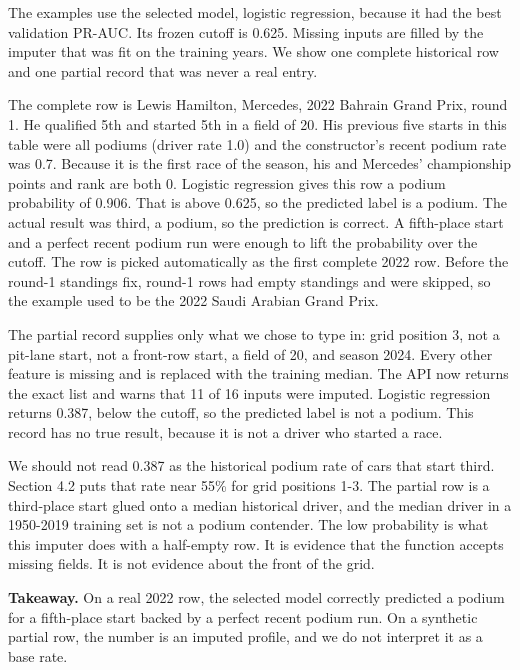 \documentclass[10pt,a4paper]{article}
\begin{document}
The examples use the selected model, logistic regression, because it had the best validation PR-AUC. Its frozen cutoff is 0.625. Missing inputs are filled by the imputer that was fit on the training years. We show one complete historical row and one partial record that was never a real entry.


The complete row is Lewis Hamilton, Mercedes, 2022 Bahrain Grand Prix, round 1. He qualified 5th and started 5th in a field of 20. His previous five starts in this table were all podiums (driver rate 1.0) and the constructor's recent podium rate was 0.7. Because it is the first race of the season, his and Mercedes' championship points and rank are both 0. Logistic regression gives this row a podium probability of 0.906. That is above 0.625, so the predicted label is a podium. The actual result was third, a podium, so the prediction is correct. A fifth-place start and a perfect recent podium run were enough to lift the probability over the cutoff. The row is picked automatically as the first complete 2022 row. Before the round-1 standings fix, round-1 rows had empty standings and were skipped, so the example used to be the 2022 Saudi Arabian Grand Prix.


The partial record supplies only what we chose to type in: grid position 3, not a pit-lane start, not a front-row start, a field of 20, and season 2024. Every other feature is missing and is replaced with the training median. The API now returns the exact list and warns that 11 of 16 inputs were imputed. Logistic regression returns 0.387, below the cutoff, so the predicted label is not a podium. This record has no true result, because it is not a driver who started a race.


We should not read 0.387 as the historical podium rate of cars that start third. Section 4.2 puts that rate near 55\% for grid positions 1-3. The partial row is a third-place start glued onto a median historical driver, and the median driver in a 1950-2019 training set is not a podium contender. The low probability is what this imputer does with a half-empty row. It is evidence that the function accepts missing fields. It is not evidence about the front of the grid.


\begin{takeaway}
\textbf{Takeaway.} On a real 2022 row, the selected model correctly predicted a podium for a fifth-place start backed by a perfect recent podium run. On a synthetic partial row, the number is an imputed profile, and we do not interpret it as a base rate.
\end{takeaway}
\end{document}
